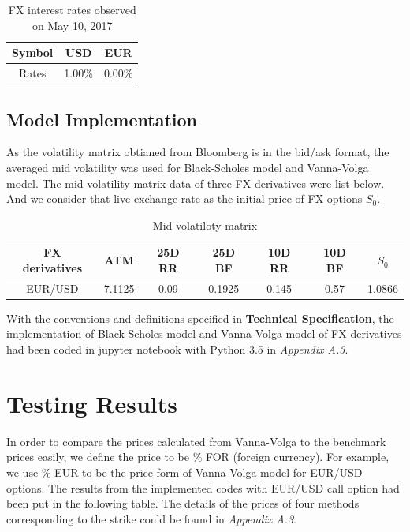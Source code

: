 \begin{table}[htb]
\centering
\caption{{FX interest rates observed on May 10, 2017}}
\begin{tabular}{ccc}
\hline	\hline %
Symbol & USD & EUR   \\ [1ex]%
\hline
Rates & 1.00\% & 0.00\%    \\ [1ex]
\hline
\end{tabular}
\label{table:FX_rates}
\end{table}

\subsection{Model Implementation}
As the volatility matrix obtianed from Bloomberg is in the bid/ask format, the averaged mid volatility was used for Black-Scholes model and Vanna-Volga model. The mid volatility matrix data of three FX derivatives were list below. And we consider that live exchange rate as the initial price of FX options $S_0$.

\begin{table}[htb]
\centering
\caption{Mid volatiloty matrix}
\begin{tabular}{ccccccc}
\hline \hline
FX derivatives & ATM  & 25D RR  & 25D BF  & 10D RR  & 10D BF & $S_0$\\ [0.5ex]
\hline 
EUR/USD  & 7.1125 &0.09& 0.1925 &0.145 &0.57&1.0866 \\[0.5ex]
\hline
\end{tabular}
\end{table}

\noindent
With the conventions and definitions specified in \textbf{Technical Specification}, the implementation of Black-Scholes model and Vanna-Volga model of FX derivatives had been coded in jupyter notebook with Python 3.5 in \textit{Appendix A.3}.

\section{Testing Results}
In order to compare the prices calculated from Vanna-Volga to the benchmark prices easily, we define the price to be \% FOR (foreign currency). For example, we use \% EUR to be the price form of Vanna-Volga model for EUR/USD options.
\newline
\newline
The results from the implemented codes with EUR/USD call option had been put in the following table. The details of the prices of four methods corresponding to the strike could be found in \textit{Appendix A.3}.

